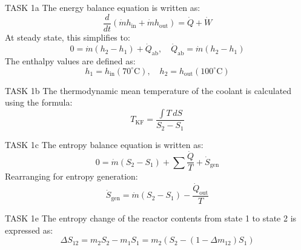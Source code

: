 TASK 1a  
The energy balance equation is written as:  
\[
\frac{d}{dt} \left( \dot{m} h_{\text{in}} + \dot{m} h_{\text{out}} \right) = \dot{Q} + \dot{W}
\]  
At steady state, this simplifies to:  
\[
0 = \dot{m} (h_2 - h_1) + \dot{Q}_{\text{ab}}, \quad \dot{Q}_{\text{ab}} = \dot{m} (h_2 - h_1)
\]  
The enthalpy values are defined as:  
\[
h_1 = h_{\text{in}} (70^\circ\text{C}), \quad h_2 = h_{\text{out}} (100^\circ\text{C})
\]  

TASK 1b  
The thermodynamic mean temperature of the coolant is calculated using the formula:  
\[
T_{\text{KF}} = \frac{\int T \, dS}{S_2 - S_1}
\]  

TASK 1c  
The entropy balance equation is written as:  
\[
0 = \dot{m} (S_2 - S_1) + \sum \frac{\dot{Q}}{T} + \dot{S}_{\text{gen}}
\]  
Rearranging for entropy generation:  
\[
\dot{S}_{\text{gen}} = \dot{m} (S_2 - S_1) - \frac{\dot{Q}_{\text{out}}}{T}
\]  

TASK 1e  
The entropy change of the reactor contents from state 1 to state 2 is expressed as:  
\[
\Delta S_{12} = m_2 S_2 - m_1 S_1 = m_2 \left( S_2 - (1 - \Delta m_{12}) S_1 \right)
\]  